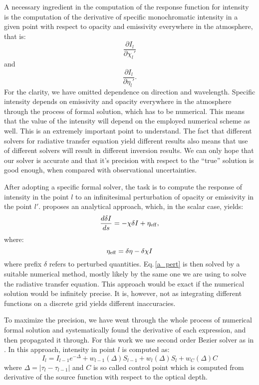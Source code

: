 \documentclass[referee]{aa}
\begin{document}
A necessary ingredient in the computation of the response function for intensity is the computation of the derivative of specific monochromatic intensity in a given point with respect to opacity and emissivity everywhere in the atmosphere, that is:
$$\frac{\partial I_l}{\partial \chi_l'}$$ 
and 
$$\frac{\partial I_l}{\partial \eta_l'}.$$ 
For the clarity, we have omitted dependence on direction and wavelength. Specific intensity depends on emissivity and opacity everywhere in the atmosphere through the process of formal solution, which has to be numerical. This means that the value of the intensity will depend on the employed numerical scheme as well. This is an extremely important point to understand. The fact that different solvers for radiative transfer equation yield different results also means that use of different solvers will result in different inversion results. We can only hope that our solver is accurate and that it's precision with respect to the ``true'' solution is good enough, when compared with observational uncertainties.

After adopting a specific formal solver, the task is to compute the response of intensity in the point $l$ to an infinitesimal perturbation of opacity or emissivity in the point $l'$. \citet{dtibook} proposes an analytical approach, which, in the scalar case, yields:
\begin{equation}
 \frac{d\delta I}{ds} = -\chi \delta I + \eta_{\rm{eff}},
 \label{a_pert}
\end{equation}
where:
\begin{equation}
\eta_{\rm{eff}} = \delta \eta - \delta \chi I
\end{equation}
where prefix $\delta$ refers to perturbed quantities. Eq.\,\ref{a_pert} is then solved by a suitable numerical method, mostly likely by the same one we are using to solve the radiative transfer equation. This approach would be exact if the numerical solution would be infinitely precise. It is, however, not as integrating different functions on a discrete grid yields different inaccuracies. 

To maximize the precision, we have went through the whole process of numerical formal solution and systematically found the derivative of each expression, and then propagated it through. For this work we use second order Bezier solver as in \citet{JaimeBezier}. In this approach, intensity in point $l$ is computed as:
\begin{equation}
 I_l = I_{l-1} e^{-\Delta} + w_{l-1}(\Delta)S_{l-1} + w_{l}(\Delta) S_l + w_C(\Delta) C
 \label{bezier}
\end{equation}
where $\Delta=|\tau_l - \tau_{l-1}|$ and $C$ is so called control point which is computed from derivative of the source function with respect to the optical depth. 
\end{document}
